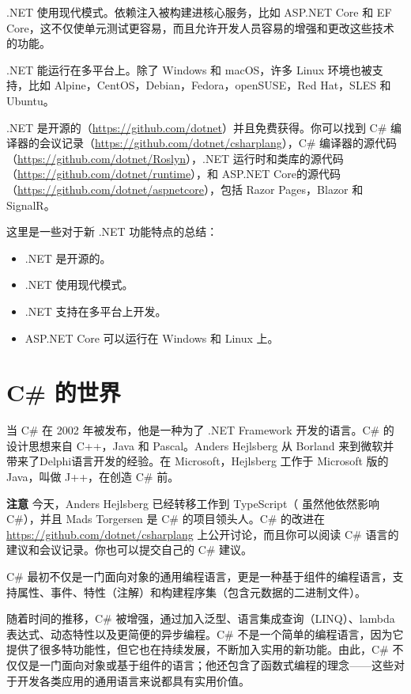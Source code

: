 .NET 使用现代模式。依赖注入被构建进核心服务，比如 ASP.NET Core 和 EF Core，这不仅使单元测试更容易，而且允许开发人员容易的增强和更改这些技术的功能。

.NET 能运行在多平台上。除了 Windows 和 macOS，许多 Linux 环境也被支持，比如 Alpine，CentOS，Debian，Fedora，openSUSE，Red Hat，SLES 和 Ubuntu。

.NET 是开源的（\url{https://github.com/dotnet}）并且免费获得。你可以找到 C\# 编译器的会议记录（\url{https://github.com/dotnet/csharplang}），C\# 编译器的源代码（\url{https://github.com/dotnet/Roslyn}），.NET 运行时和类库的源代码（\url{https://github.com/dotnet/runtime}），和 ASP.NET Core的源代码（\url{https://github.com/dotnet/aspnetcore}），包括 Razor Pages，Blazor 和 SignalR。

这里是一些对于新 .NET 功能特点的总结：
\begin{itemize}
    \item .NET 是开源的。
    \item .NET 使用现代模式。
    \item .NET 支持在多平台上开发。
    \item ASP.NET Core 可以运行在 Windows 和 Linux 上。
\end{itemize}

\section*{C\# 的世界}
当 C\# 在 2002 年被发布，他是一种为了 .NET Framework 开发的语言。C\# 的设计思想来自 C++，Java 和 Pascal。Anders Hejlsberg 从 Borland 来到微软并带来了Delphi语言开发的经验。在 Microsoft，Hejlsberg 工作于 Microsoft 版的 Java，叫做 J++，在创造 C\# 前。

\begin{framed}
    \textbf{注意} 今天，Anders Hejlsberg 已经转移工作到 TypeScript（ 虽然他依然影响 C\#），并且 Mads Torgersen 是 C\# 的项目领头人。C\# 的改进在 \url{https://github.com/dotnet/csharplang} 上公开讨论，而且你可以阅读 C\# 语言的建议和会议记录。你也可以提交自己的 C\# 建议。
\end{framed}

C\# 最初不仅是一门面向对象的通用编程语言，更是一种基于组件的编程语言，支持属性、事件、特性（注解）和构建程序集（包含元数据的二进制文件）。

随着时间的推移，C\# 被增强，通过加入泛型、语言集成查询（LINQ）、lambda 表达式、动态特性以及更简便的异步编程。C\# 不是一个简单的编程语言，因为它提供了很多特功能性，但它也在持续发展，不断加入实用的新功能。由此，C\# 不仅仅是一门面向对象或基于组件的语言；他还包含了函数式编程的理念——这些对于开发各类应用的通用语言来说都具有实用价值。

